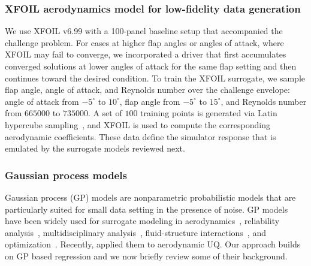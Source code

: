 \documentclass[a4paper,12pt]{article}
\begin{document}
\subsubsection{XFOIL aerodynamics model for low-fidelity data generation}
\label{sec:xfoil}
We use XFOIL v6.99 with a 100-panel baseline setup that accompanied the challenge problem. For cases at higher flap angles or angles of attack, where XFOIL may fail to converge, we incorporated a driver that first accumulates converged solutions at lower angles of attack for the same flap setting and then continues toward the desired condition. To train the XFOIL surrogate, we sample flap angle, angle of attack, and Reynolds number over the challenge envelope: angle of attack from $-5^\circ$ to $10^\circ$, flap angle from $-5^\circ$ to $15^\circ$, and Reynolds number from $665000$ to $735000$. A set of $100$ training points is generated via Latin hypercube sampling~\cite{loh1996latin}, and XFOIL is used to compute the corresponding aerodynamic coefficients. These data define the simulator response that is emulated by the surrogate models reviewed next.

\subsubsection{Gaussian process models}
Gaussian process (GP) models are nonparametric probabilistic models that are particularly suited for small data setting in the presence of noise. GP models have been widely used for surrogate modeling in aerodynamics~\cite{renganathan2021enhanced,ashwin2022data}, reliability analysis~\cite{renganathan2022multifidelity, renganathan2023camera,booth2025contour, renganathan2024efficient}, multidisciplinary analysis~\cite{yuan2026remal}, fluid-structure interactions~\cite{adhikary2026adaptive}, and optimization~\cite{carlson2025multiobjective, renganathan2025q,renganathan2021lookahead}. Recently, \citet{davis2026uncertainty} applied them to aerodynamic UQ. Our approach builds on GP based regression and we now briefly review some of their background.
\end{document}
